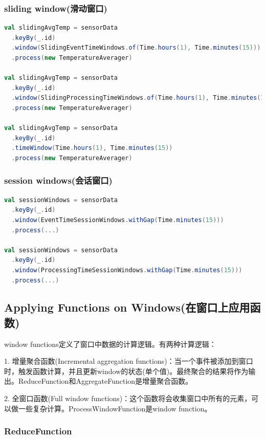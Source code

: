 \documentclass[oneside]{ctexbook}
\begin{document}
\subsubsection{sliding window(滑动窗口)}

\begin{lstlisting}[language=scala]
val slidingAvgTemp = sensorData
  .keyBy(_.id)
  .window(SlidingEventTimeWindows.of(Time.hours(1), Time.minutes(15)))
  .process(new TemperatureAverager)

val slidingAvgTemp = sensorData
  .keyBy(_.id)
  .window(SlidingProcessingTimeWindows.of(Time.hours(1), Time.minutes(15)))
  .process(new TemperatureAverager)

val slidingAvgTemp = sensorData
  .keyBy(_.id)
  .timeWindow(Time.hours(1), Time.minutes(15))
  .process(new TemperatureAverager)
\end{lstlisting}

\subsubsection{session windows(会话窗口)}

\begin{lstlisting}[language=scala]
val sessionWindows = sensorData
  .keyBy(_.id)
  .window(EventTimeSessionWindows.withGap(Time.minutes(15)))
  .process(...)

val sessionWindows = sensorData
  .keyBy(_.id)
  .window(ProcessingTimeSessionWindows.withGap(Time.minutes(15)))
  .process(...)
\end{lstlisting}

\subsection{Applying Functions on Windows(在窗口上应用函数)}

window functions定义了窗口中数据的计算逻辑。有两种计算逻辑：

1. 增量聚合函数(Incremental aggregation functions)：当一个事件被添加到窗口时，触发函数计算，并且更新window的状态(单个值)。最终聚合的结果将作为输出。ReduceFunction和AggregateFunction是增量聚合函数。

2. 全窗口函数(Full window functions)：这个函数将会收集窗口中所有的元素，可以做一些复杂计算。ProcessWindowFunction是window function。

\subsubsection{ReduceFunction}
\end{document}
